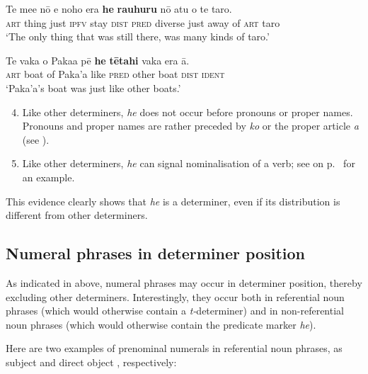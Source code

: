 \ea\label{ex:5.54}
\gll Te me{\ꞌ}e nō e noho era \textbf{he} \textbf{rauhuru} nō atu o te taro. \\
\textsc{art} thing just \textsc{ipfv} stay \textsc{dist} \textsc{pred} diverse just away of \textsc{art} taro \\

\glt 
‘The only thing that was still there, was many kinds of taro.’ \textstyleExampleref{[R363.004]} 
\z

\ea\label{ex:5.55}
\gll Te vaka o Paka{\ꞌ}a pē \textbf{he} \textbf{tētahi} vaka era {\ꞌ}ā. \\
\textsc{art} boat of Paka’a like \textsc{pred} other boat \textsc{dist} \textsc{ident} \\

\glt 
‘Paka’a’s boat was just like other boats.’ \textstyleExampleref{[R344.040]} 
\z

\begin{enumerate}
\setcounter{enumi}{3}
\item
Like other determiners, \textit{he} does not occur before pronouns or proper names. 
Pronouns and proper names are rather preceded by \textit{ko} or the proper article \textit{a} (see ).

\item
Like other determiners, \textit{he} can signal nominalisation of a verb; see  on p.~\pageref{ex:3.23} for an example.
\end{enumerate}

This evidence clearly shows that \textit{he} is a determiner, even if its distribution is different from other determiners. 
\subsection{Numeral phrases in determiner position}\label{sec:5.3.5}
As indicated in  above, numeral phrases may occur in determiner position, thereby excluding other determiners. Interestingly, they occur both in referential noun phrases (which would otherwise contain a \textit{t-}determiner) and in non-referential noun phrases (which would otherwise contain the predicate marker \textit{he}).

Here are two examples of prenominal numerals in referential noun phrases, as subject  and direct object , respectively:

